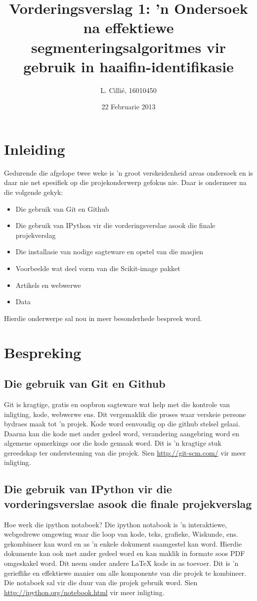 \documentclass[a4paper,10pt]{article}
\title{Vorderingsverslag 1: 'n Ondersoek na effektiewe segmenteringsalgoritmes vir gebruik in haaifin-identifikasie}
\author{L. Cilli\'{e}, 16010450}
\date{22 Februarie 2013}
\begin{document}
\maketitle
\section{Inleiding}
Gedurende die afgelope twee weke is 'n groot verskeidenheid areas ondersoek
en is daar nie net spesifiek op die projekonderwerp gefokus nie.  Daar is ondermeer na die volgende gekyk:
\begin{itemize}
 \item Die gebruik van Git en Github
 \item Die gebruik van IPython vir die vorderingsverslae asook die finale projekverslag
 \item Die installasie van nodige sagteware en opstel van die masjien
 \item Voorbeelde wat deel vorm van die Scikit-image pakket
 \item Artikels en webwerwe
 \item Data
\end{itemize}

\noindent Hierdie onderwerpe sal nou in meer besonderhede bespreek word.

\section{Bespreking}
\subsection{Die gebruik van Git en Github}
Git is kragtige, gratis en oopbron sagteware wat help met die kontrole van inligting, kode, webwerwe ens.  
Dit vergemaklik die proses waar verskeie persone bydraes maak tot 'n projek.  Kode word eenvoudig op die github
stelsel gelaai. Daarna kan die kode met ander gedeel word, verandering aangebring word en algemene opmerkings oor die kode gemaak word.
Dit is 'n kragtige stuk gereedskap ter ondersteuning van die projek. Sien \url{http://git-scm.com/} vir meer inligting.

\subsection{Die gebruik van IPython vir die vorderingsverslae asook die finale projekverslag}
Hoe werk die ipython notaboek?  Die ipython notabook is 'n interaktiewe, webgedrewe omgewing waar die loop van kode,
teks, grafieke, Wiskunde, ens. gekombineer kan word en as 'n enkele dokument saamgestel kan word. Hierdie dokumente kan ook met 
ander gedeel word en kan maklik in formate soos PDF omgeskakel word.  Dit neem onder andere \mbox{\LaTeX } kode in as toevoer.   Dit is 'n gerieflike en effektiewe manier om alle 
komponente van die projek te kombineer. Die notaboek sal vir die duur van die projek gebruik word. Sien \url{http://ipython.org/notebook.html} vir meer inligting.
\end{document}
